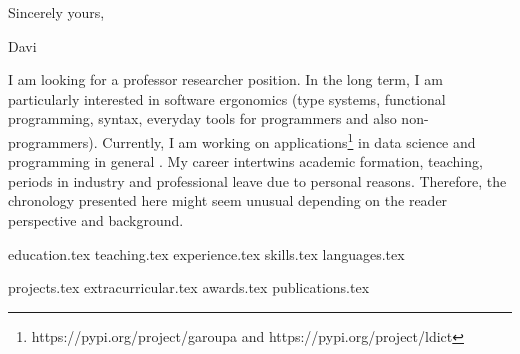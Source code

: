 \documentclass[letterpaper,11pt]{article}
\begin{document}
{\justifying
\Large
{}
\vspace{30pt}
\hspace{420pt} Sincerely yours,
\vspace{10pt}

\hspace{420pt} Davi
}

\newpage


\vspace{0.35cm}
{\justifying
I am looking for a professor researcher position.
In the long term, I am particularly interested in software ergonomics (type systems, functional programming, syntax, everyday tools for programmers and also non-programmers).
Currently, I am working on applications\footnote{https://pypi.org/project/garoupa and https://pypi.org/project/ldict} in data science and programming in general \cite{pereirasantos2021predictable}. 
My career intertwins academic formation, teaching, periods in industry and professional leave due to personal reasons.
Therefore, the chronology presented here might seem unusual depending on the reader perspective and background.

}

{education.tex}
{teaching.tex}
\pagebreak
{experience.tex}
\sidebyside
    {{skills.tex}}
    {{languages.tex}}


{projects.tex}
\pagebreak
{extracurricular.tex}
{awards.tex}
{publications.tex}
\end{document}
